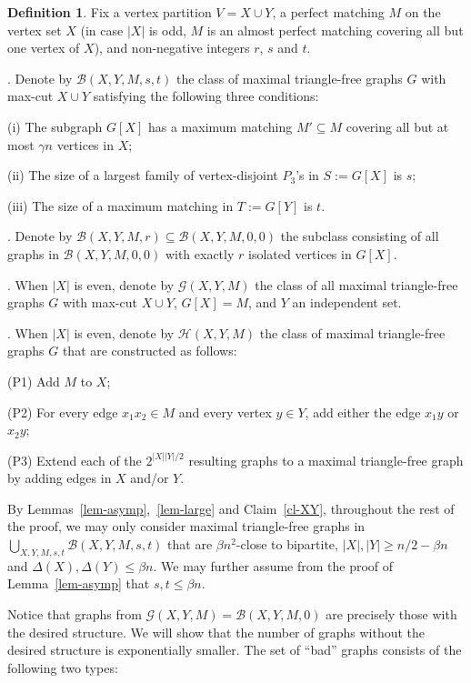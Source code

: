 \documentclass[12pt]{article}
\theoremstyle{definition}
\theoremstyle{definition}
\theoremstyle{definition}
\theoremstyle{definition}
\newtheorem{defn}[theorem]{Definition}
\theoremstyle{definition}
\theoremstyle{definition}
\theoremstyle{definition}
\newcommand{\ga}{\gamma}
\newcommand{\De}{\Delta}
\newcommand{\cH}{\mathcal{H}}
\newcommand{\cG}{\mathcal{G}}
\newcommand{\cB}{\mathcal{B}}
\newcommand{\3}{\bf{3}}
\begin{document}
\begin{defn}
Fix a vertex partition $V=X\cup Y$, a perfect matching $M$ on the vertex set $X$ (in case $|X|$ is odd, $M$ is an almost perfect matching covering all but one vertex of $X$), and non-negative integers $r$, $s$ and $t$. 

\medskip

. Denote by $\cB(X,Y,M,s,t)$ the class of maximal triangle-free graphs $G$ with max-cut $X\cup Y$ satisfying the following three conditions:

(i) The subgraph $G[X]$ has a maximum matching $M'\subseteq M$ covering all but at most $\ga n$ vertices in $X$; 

(ii) The size of a largest family of vertex-disjoint $P_3$'s in $S:=G[X]$ is $s$;

(iii) The size of a maximum matching in $T:=G[Y]$ is $t$.

\medskip

. Denote by $\cB(X,Y,M, r)\subseteq \cB(X,Y,M,0,0)$ the subclass consisting of all graphs in $\cB(X,Y,M,0,0)$ with exactly $r$ isolated vertices in $G[X]$.

\medskip

. When $|X|$ is even, denote by $\cG(X,Y,M)$ the class of all maximal triangle-free graphs $G$ with max-cut $X\cup Y$,  $G[X]=M$, and $Y$ an independent set. 

\medskip

. When $|X|$ is even, denote by $\cH(X,Y,M)$ the class of maximal triangle-free graphs $G$ that are constructed as follows: 

(P1) Add $M$ to $X$; 

(P2) For every edge $x_1x_2\in M$ and every vertex $y\in Y$, add either the edge $x_1y$ or $x_2y$;

(P3) Extend each of the $2^{|X||Y|/2}$ resulting graphs to a maximal triangle-free graph by adding edges in $X$ and/or $Y$.
\end{defn}

By Lemmas~\ref{lem-asymp},~\ref{lem-large} and Claim~\ref{cl-XY}, throughout the rest of the proof, we may only consider maximal triangle-free graphs in $\bigcup_{X,Y,M,s,t}\cB(X,Y,M,s,t)$ that are $\beta n^2$-close to bipartite, $|X|,|Y|\ge n/2-\beta n$ and $\De(X),\De(Y)\le \beta n$. We may further assume from the proof of Lemma~\ref{lem-asymp} that $s,t\le \beta n$.

Notice that graphs from $\cG(X,Y,M)=\cB(X,Y,M,0)$ are precisely those with the desired structure. We will show that the number of graphs without the desired structure is exponentially smaller. The set of ``bad'' graphs consists of the following two types:
\end{document}
